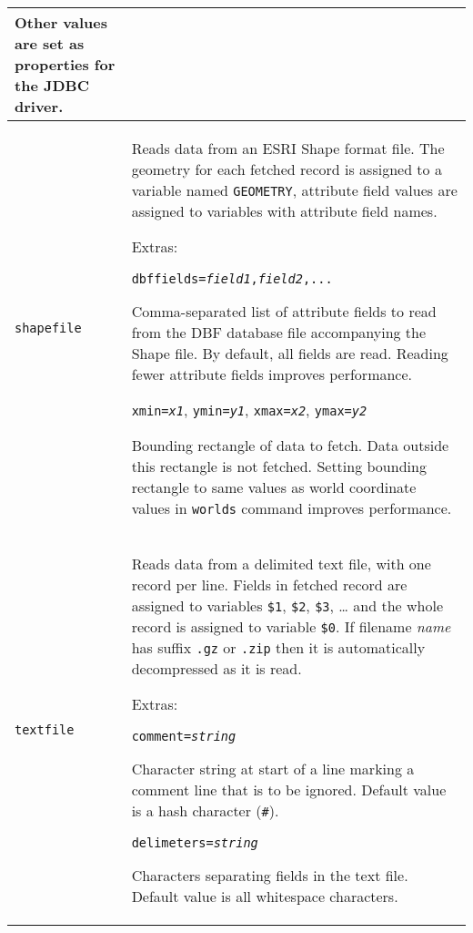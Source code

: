 \begin{longtable}{|p{3cm}|p{10cm}|}
\vspace{10pt}
Other values are set as properties for the JDBC driver. \\

\hline

\texttt{shapefile} &
Reads data from an ESRI Shape format file.
The geometry for each fetched record is assigned to a variable named
\texttt{GEOMETRY}, attribute field values are assigned to
variables with attribute field names.

\vspace{10pt}
Extras:

\texttt{dbffields=\textit{field1},\textit{field2},...}

Comma-separated list of
attribute fields to read from the DBF database file accompanying the
Shape file.  By default, all fields are read.  Reading fewer attribute
fields improves performance.

\vspace{10pt}
\texttt{xmin=\textit{x1}},
\texttt{ymin=\textit{y1}},
\texttt{xmax=\textit{x2}},
\texttt{ymax=\textit{y2}}

Bounding rectangle of data to fetch.  Data outside this rectangle is
not fetched.  Setting bounding rectangle to same values as world
coordinate values in \texttt{worlds} command improves performance. \\

\hline

\texttt{textfile} &
Reads data from a delimited text file, with one
record per line.  Fields in fetched record
are assigned to variables
\texttt{\$1}, \texttt{\$2}, \texttt{\$3}, \dots
and the whole record is assigned to variable
\texttt{\$0}.
If filename \textit{name} has suffix \texttt{.gz} or \texttt{.zip}
then it is automatically decompressed as it is read.

\vspace{10pt}
Extras:

\texttt{comment=\textit{string}}

Character string at start of a line marking a comment line that
is to be ignored.  Default value is a hash character (\texttt{\#}).

\vspace{10pt}
\texttt{delimeters=\textit{string}}

Characters separating fields in the text file.  Default value
is all whitespace characters. \\

\end{longtable}

